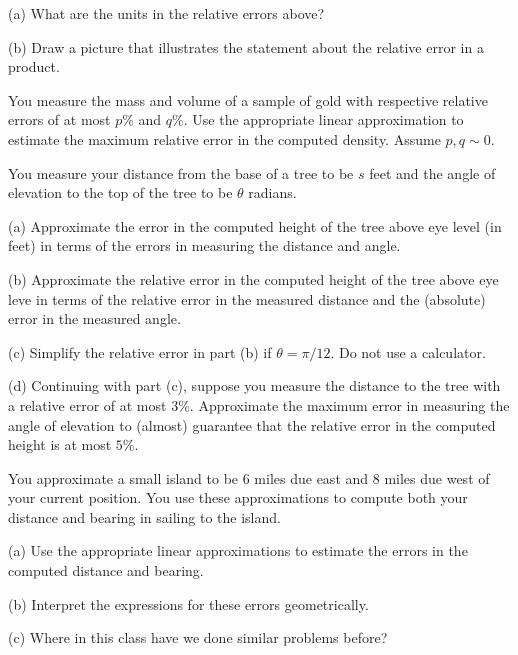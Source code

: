 \documentclass{ximera}
\begin{document}
\begin{question}   \label{Qefg547ji8}
(a) What are the units in the relative errors above?

(b) Draw a picture that illustrates the statement about the relative error in a product.
\end{question}
 
\begin{question}  \label{Qert5ty7}
You measure the mass and volume of a sample of gold with respective relative errors of at most $p\%$ and $q\%$. Use the appropriate linear approximation to estimate the maximum relative error in the computed density. Assume $p,q\sim 0$.

\end{question}



\begin{question}  \label{Qerfgghym}
You measure your distance from the base of a tree to be $s$ feet and the angle of elevation to the top of the tree to be $\theta$ radians.

(a) Approximate the error in the computed height of the tree above eye level (in feet) in terms of the errors in measuring the distance and angle.

(b) Approximate the relative error in the computed height of the tree above eye leve in terms of the relative error in the measured distance and the (absolute) error in the measured angle. 

(c) Simplify the relative error in part (b) if $\theta=\pi/12$. Do not use a calculator.

(d) Continuing with part (c), suppose you measure the distance to the tree with a relative error of at most $3\%$. Approximate the maximum error in measuring the angle of elevation to (almost) guarantee that the relative error in the computed height is at most $5\%$.
\end{question}


\begin{question}  \label{QE4gb4ttb}
You approximate a small island to be $6$ miles due east and $8$ miles due west of your current position. You use these approximations to compute both your distance and bearing in sailing to the island. 

(a) Use the appropriate linear approximations to estimate the errors in the computed distance and bearing.

(b) Interpret the expressions for these errors geometrically.

(c) Where in this class have we done similar problems before?

\end{question}
\end{document}
